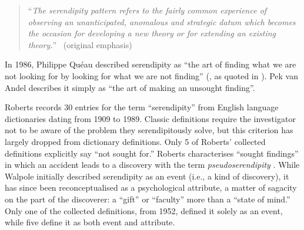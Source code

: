 \begin{quote}
``\emph{The serendipity pattern refers to the fairly common experience of observing an \emph{unanticipated}, \emph{anomalous} \emph{and strategic} datum which becomes the occasion for developing a new theory or for extending an existing theory.}''~\cite[p. 506]{merton1948bearing} (original emphasis)
\end{quote}

In 1986, Philippe Qu\'eau described serendipity as ``the art of
finding what we are not looking for by looking for what we are not
finding'' (, as quoted in
).  Pek van Andel
\citeyear[p. 631]{van1994anatomy} describes it simply as ``the art of
making an unsought finding''.


Roberts \citeyear[pp. 246--249]{roberts} records 30 entries for the term ``serendipity'' from English language dictionaries dating from 1909 to 1989.  
%
Classic definitions require the investigator not to be aware of the problem they serendipitously solve, but this criterion has largely dropped from dictionary definitions. Only 5 of Roberts' collected definitions explicitly say ``not sought for.''  Roberts characterises ``sought findings'' in which an accident leads to a discovery with the term \emph{pseudoserendipity} \cite{chumaceiro1995serendipity}.
%
While Walpole initially described serendipity as an event
(i.e., a kind of discovery), it has
since been reconceptualised as a psychological attribute, a matter of
sagacity on the part of the discoverer: a ``gift'' or ``faculty'' more
than a ``state of mind.''  Only one of the collected definitions, from
1952, defined it solely as an event, while five define it as both
event and attribute.

